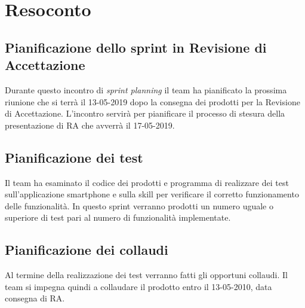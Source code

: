 \clearpage
\section{Resoconto}
	\subsection{Pianificazione dello sprint in Revisione di Accettazione}
	\label{sec:sprint}
	Durante questo incontro di \textit{sprint planning} il team ha pianificato la prossima riunione che si terrà il 13-05-2019 dopo la consegna dei prodotti per la Revisione di Accettazione. L'incontro servirà per pianificare il processo di stesura della presentazione di RA che avverrà il 17-05-2019.
	\subsection{Pianificazione dei test}
	\label{sec:test}
	Il team ha esaminato il codice dei prodotti e programma di realizzare dei test sull'applicazione smartphone e sulla skill per verificare il corretto funzionamento delle funzionalità. In questo sprint verranno prodotti un numero uguale o superiore di test pari al numero di funzionalità implementate. 
	\subsection{Pianificazione dei collaudi}
	\label{sec:collaudi}
	Al termine della realizzazione dei test verranno fatti gli opportuni collaudi. Il team si impegna quindi a collaudare il prodotto entro il 13-05-2010, data consegna di RA.
